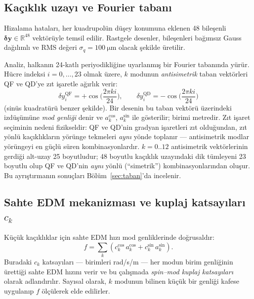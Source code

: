 \documentclass[preprint,12pt]{elsarticle}
\begin{document}
\subsection{Kaçıklık uzayı ve Fourier tabanı}
\label{sec:taban-tanim}

Hizalama hataları, her kuadrupolün düşey konumuna eklenen 48 bileşenli
$\boldsymbol{\delta y}\in\mathbb{R}^{48}$ vektörüyle temsil edilir.
Rastgele desenler, bileşenleri bağımsız Gauss dağılımlı ve RMS değeri
$\sigma_q=\SI{100}{\micro\meter}$ olacak şekilde üretilir.

Analiz, halkanın 24-katlı periyodikliğine uyarlanmış bir Fourier
tabanında yürür. Hücre indeksi $i=0,\dots,23$ olmak üzere, $k$
modunun \emph{antisimetrik} taban vektörleri QF ve QD'ye zıt işaretle
ağırlık verir:
\begin{equation}
\delta y^\mathrm{QF}_i=+\cos\!\Big(\frac{2\pi k i}{24}\Big),\qquad
\delta y^\mathrm{QD}_i=-\cos\!\Big(\frac{2\pi k i}{24}\Big)
\label{eq:antisim-taban}
\end{equation}
(sinüs kuadratürü benzer şekilde). Bir desenin bu taban vektörü
üzerindeki izdüşümüne \emph{mod genliği} denir ve
$a_k^{\cos}$, $a_k^{\sin}$ ile gösterilir; birimi metredir. Zıt işaret
seçiminin nedeni fizikseldir: QF ve QD'nin gradyan işaretleri zıt
olduğundan, zıt yönlü kaçıklıkların yörünge tekmeleri \emph{aynı}
yönde toplanır --- antisimetrik modlar yörüngeyi en güçlü süren
kombinasyonlardır. $k=0..12$ antisimetrik vektörlerinin gerdiği
alt-uzay 25 boyutludur; 48 boyutlu kaçıklık uzayındaki dik tümleyeni
23 boyutlu olup QF ve QD'nin \emph{aynı} yönlü (``simetrik'')
kombinasyonlarından oluşur. Bu ayrıştırmanın sonuçları
Bölüm~\ref{sec:taban}'da incelenir.

\subsection{Sahte EDM mekanizması ve kuplaj katsayıları $c_k$}
\label{sec:ck-tanim}

Küçük kaçıklıklar için sahte EDM hızı mod genliklerinde doğrusaldır:
\begin{equation}
f = \sum_k \left( c_k^{\cos}\, a_k^{\cos} + c_k^{\sin}\, a_k^{\sin}
\right).
\label{eq:dogrusal-model}
\end{equation}
Buradaki $c_k$ katsayıları --- birimleri rad/s/m --- her modun birim
genliğinin ürettiği sahte EDM hızını verir ve bu çalışmada
\emph{spin--mod kuplaj katsayıları} olarak adlandırılır. Sayısal
olarak, $k$ modunun bilinen küçük bir genliği kafese uygulanıp $f$
ölçülerek elde edilirler.
\end{document}

